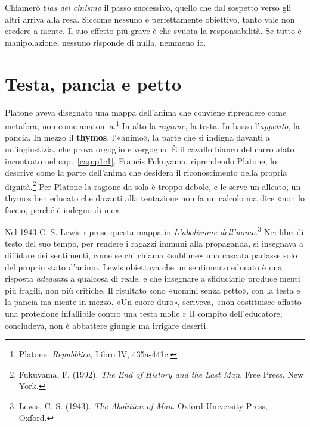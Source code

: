 Chiamerò \textit{bias del cinismo} il passo successivo, quello che dal sospetto verso gli altri arriva alla resa. Siccome nessuno è perfettamente obiettivo, tanto vale non credere a niente. Il suo effetto più grave è che svuota la responsabilità. Se tutto è manipolazione, nessuno risponde di nulla, nemmeno io.

\section{Testa, pancia e petto}

Platone aveva disegnato una mappa dell'anima che conviene riprendere come metafora, non come anatomia.\footnote{Platone. \textit{Repubblica}, Libro IV, 435a-441c.} In alto la \textit{ragione}, la testa. In basso l'\textit{appetito}, la pancia. In mezzo il \textbf{thymos}, l'«animo», la parte che si indigna davanti a un'ingiustizia, che prova orgoglio e vergogna. È il cavallo bianco del carro alato incontrato nel cap.~\ref{cap:p1c1}. Francis Fukuyama, riprendendo Platone, lo descrive come la parte dell'anima che desidera il riconoscimento della propria dignità.\footnote{Fukuyama, F. (1992). \textit{The End of History and the Last Man}. Free Press, New York.} Per Platone la ragione da sola è troppo debole, e le serve un alleato, un thymos ben educato che davanti alla tentazione non fa un calcolo ma dice «non lo faccio, perché è indegno di me».

Nel 1943 C. S. Lewis riprese questa mappa in \textit{L'abolizione dell'uomo}.\footnote{Lewis, C. S. (1943). \textit{The Abolition of Man}. Oxford University Press, Oxford.} Nei libri di testo del suo tempo, per rendere i ragazzi immuni alla propaganda, si insegnava a diffidare dei sentimenti, come se chi chiama «sublime» una cascata parlasse solo del proprio stato d'animo. Lewis obiettava che un sentimento educato è una risposta \textit{adeguata} a qualcosa di reale, e che insegnare a sfiduciarlo produce menti più fragili, non più critiche. Il risultato sono «uomini senza petto», con la testa e la pancia ma niente in mezzo. «Un cuore duro», scriveva, «non costituisce affatto una protezione infallibile contro una testa molle.» Il compito dell'educatore, concludeva, non è abbattere giungle ma irrigare deserti.


